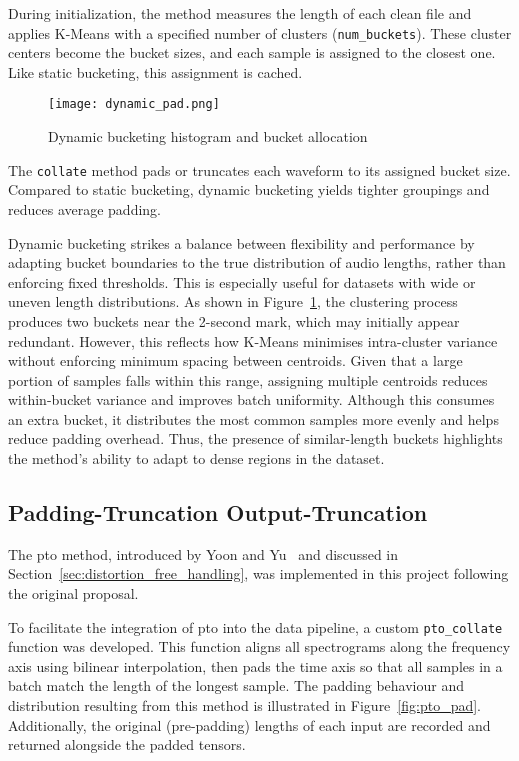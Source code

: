 During initialization, the method measures the length of each clean file and applies K-Means with a specified number of clusters (\texttt{num\_buckets}). These cluster centers become the bucket sizes, and each sample is assigned to the closest one. Like static bucketing, this assignment is cached.

\begin{figure}[H]
    \centering
    \texttt{[image: dynamic\_pad.png]}
    \caption{Dynamic bucketing histogram and bucket allocation}
    \label{fig:dynamic_pad}
\end{figure}

The \texttt{collate} method pads or truncates each waveform to its assigned bucket size. Compared to static bucketing, dynamic bucketing yields tighter groupings and reduces average padding.

Dynamic bucketing strikes a balance between flexibility and performance by adapting bucket boundaries to the true distribution of audio lengths, rather than enforcing fixed thresholds. This is especially useful for datasets with wide or uneven length distributions. As shown in Figure~\ref{fig:dynamic_pad}, the clustering process produces two buckets near the 2-second mark, which may initially appear redundant. However, this reflects how K-Means minimises intra-cluster variance without enforcing minimum spacing between centroids. Given that a large portion of samples falls within this range, assigning multiple centroids reduces within-bucket variance and improves batch uniformity. Although this consumes an extra bucket, it distributes the most common samples more evenly and helps reduce padding overhead. Thus, the presence of similar-length buckets highlights the method’s ability to adapt to dense regions in the dataset.

\subsection{Padding-Truncation Output-Truncation}
\label{subsec:pto_dataset}

The \gls{pto} method, introduced by Yoon and Yu~\cite{yoon2020pto} and discussed in Section~\ref{sec:distortion_free_handling}, was implemented in this project following the original proposal.

To facilitate the integration of \gls{pto} into the data pipeline, a custom \texttt{pto\_collate} function was developed. This function aligns all spectrograms along the frequency axis using bilinear interpolation, then pads the time axis so that all samples in a batch match the length of the longest sample. The padding behaviour and distribution resulting from this method is illustrated in Figure~\ref{fig:pto_pad}. Additionally, the original (pre-padding) lengths of each input are recorded and returned alongside the padded tensors.

